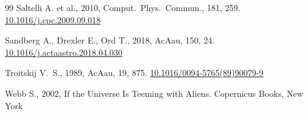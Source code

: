 \documentclass[11pt,a4paper,onecolumn]{article}
\newcommand{\doi}[1]{\href{https://doi.org/#1}{#1}}
\begin{document}
\begin{thebibliography}{99}
Saltelli A. et al., 2010, Comput.~Phys.~Commun., 181, 259.
\newblock \doi{10.1016/j.cpc.2009.09.018}

Sandberg A., Drexler E., Ord T., 2018, AcAau, 150, 24.
\newblock \doi{10.1016/j.actaastro.2018.04.030}

Troitskij V.~S., 1989, AcAau, 19, 875.
\newblock \doi{10.1016/0094-5765(89)90079-9}

Webb S., 2002, If the Universe Is Teeming with Aliens. Copernicus Books, New York

\end{thebibliography}
\end{document}
